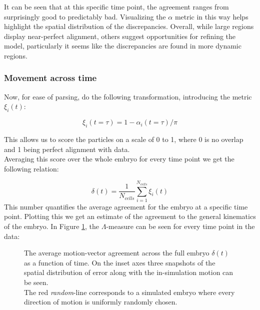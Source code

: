 It can be seen that at this specific time point, the agreement ranges from surprisingly good to predictably bad. Visualizing the $\alpha$ metric in this way helps highlight the spatial distribution of the discrepancies. Overall, while large regions display near-perfect alignment, others suggest opportunities for refining the model, particularly it seems like the discrepancies are found in more dynamic regions.\\

\subsubsection{Movement across time}

Now, for ease of parsing, do the following transformation, introducing the metric $\xi_i(t)$:

\begin{equation}
    \xi_i(t=\tau) = 1-\alpha_i(t=\tau)/\pi
\end{equation}

This allows us to score the particles on a scale of 0 to 1, where 0 is no overlap and 1 being perfect alignment with data.\\

Averaging this score over the whole embryo for every time point we get the following relation:

\begin{equation}
     \delta(t) = \frac{1}{N_{cells}} \sum_{i=1}^{N_{cells}}\xi_i(t)
\end{equation}
This number quantifies the average agreement for the embryo at a specific time point. Plotting this we get an estimate of the agreement to the general kinematics of the embryo. In Figure \ref{fig:motionAgreement}, the $\Lambda$-measure can be seen for every time point in the data:

\begin{figure}[H]
    \centering
    \caption{The average motion-vector agreement across the full embryo $\delta(t)$ as a function of time. On the inset axes three snapshots of the spatial distribution of error along with the in-simulation motion can be seen.\\
    The red \textit{random}-line corresponds to a simulated embryo where every direction of motion is uniformly randomly chosen.}
    \label{fig:motionAgreement}
\end{figure}


